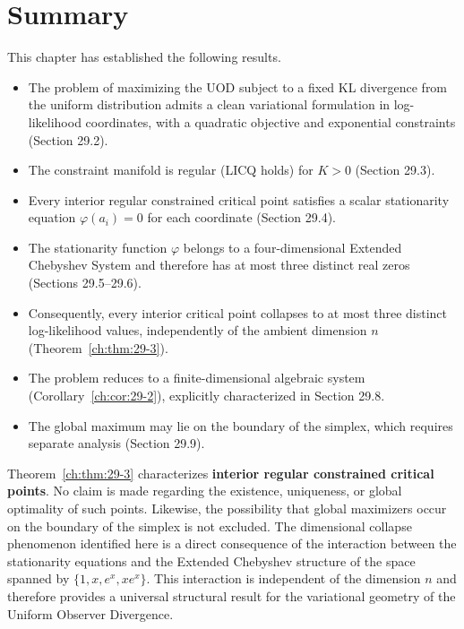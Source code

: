 \section{Summary}
This chapter has established the following results.
\begin{itemize}
\item The problem of maximizing the UOD subject to a fixed KL divergence from the uniform distribution admits a clean variational formulation in log-likelihood coordinates, with a quadratic objective and exponential constraints (Section 29.2).
\item The constraint manifold is regular (LICQ holds) for \(K>0\) (Section 29.3).
\item Every interior regular constrained critical point satisfies a scalar stationarity equation \(\varphi(a_i)=0\) for each coordinate (Section 29.4).
\item The stationarity function \(\varphi\) belongs to a four-dimensional Extended Chebyshev System and therefore has at most three distinct real zeros (Sections 29.5--29.6).
\item Consequently, every interior critical point collapses to at most three distinct log-likelihood values, independently of the ambient dimension \(n\) (Theorem~\ref{ch:thm:29-3}).
\item The problem reduces to a finite-dimensional algebraic system (Corollary~\ref{ch:cor:29-2}), explicitly characterized in Section 29.8.
\item The global maximum may lie on the boundary of the simplex, which requires separate analysis (Section 29.9).
\end{itemize}
Theorem~\ref{ch:thm:29-3} characterizes \textbf{interior regular constrained critical points}. No claim is made regarding the existence, uniqueness, or global optimality of such points. Likewise, the possibility that global maximizers occur on the boundary of the simplex is not excluded.
The dimensional collapse phenomenon identified here is a direct consequence of the interaction between the stationarity equations and the Extended Chebyshev structure of the space spanned by \(\{1,x,e^x,xe^x\}\). This interaction is independent of the dimension \(n\) and therefore provides a universal structural result for the variational geometry of the Uniform Observer Divergence.
